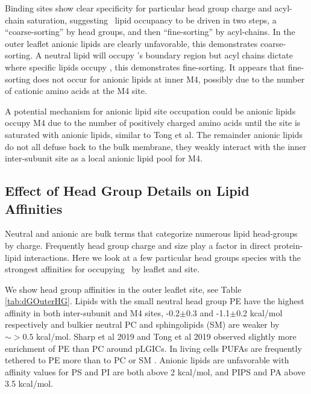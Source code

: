 Binding sites show clear specificity for particular head group charge and acyl-chain saturation, suggesting \nachr~lipid occupancy to be driven in two steps, a ``coarse-sorting'' by head groups, and then ``fine-sorting'' by acyl-chains. In the outer leaflet anionic lipids are clearly unfavorable, this demonstrates coarse-sorting. A neutral lipid will occupy \nachr's boundary region but acyl chains dictate where specific lipids occupy \nachr, this demonstrates fine-sorting. It appears that fine-sorting does not occur for anionic lipids at inner M4, possibly due to the number of cationic amino acids at the M4 site. %

A potential mechanism for anionic lipid site occupation could be anionic lipids occupy M4 due to the number of positively charged amino acids until the site is saturated with anionic lipids, similar to Tong et al\cite{Tong2019}. The remainder anionic lipids do not all defuse back to the bulk membrane, they weakly interact with the inner inter-subunit site as a local anionic lipid pool for M4. 

\subsection{Effect of Head Group Details on Lipid Affinities}


Neutral and anionic are bulk terms that categorize numerous lipid head-groups by charge. Frequently head group charge and size play a factor in direct protein-lipid interactions. Here we look at a few particular head groups species with the strongest affinities for occupying \nachr~by leaflet and site.

We show head group affinities in the outer leaflet site, see Table \ref{tab:dGOuterHG}.  Lipids with the small neutral head group PE have the highest affinity in both inter-subunit and M4 sites, -0.2$\pm$0.3 and -1.1$\pm$0.2 kcal/mol respectively and bulkier neutral PC and sphingolipids (SM) are weaker by $\sim > 0.5$ kcal/mol. Sharp et al 2019\cite{Sharp2019} and Tong et al 2019\cite{Tong2019} observed slightly more enrichment of PE than PC around pLGICs. In living cells PUFAs are frequently tethered to PE more than to PC or SM \cite{Isolated1969, Taguchi2010, Breckenridge1973,Ingolfsson2017b,Gamba2005,Lorent2020}. Anionic lipids are unfavorable with affinity values for PS and PI are both above 2 kcal/mol, and PIPS and PA above 3.5 kcal/mol.

